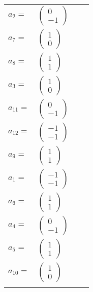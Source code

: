 \documentclass[1p]{elsarticle_modified}
\theoremstyle{definition}
\begin{document}
\begin{tabular}{m{7pt} m{180pt} m{7pt} m{180pt} }
\flushright $a_{2}=$&$\begin{pmatrix}0\\-1\end{pmatrix}$ \\
\flushright $a_{7}=$&$\begin{pmatrix}1\\0\end{pmatrix}$ \\
\flushright $a_{8}=$&$\begin{pmatrix}1\\1\end{pmatrix}$ \\
\flushright $a_{3}=$&$\begin{pmatrix}1\\0\end{pmatrix}$ \\
\flushright $a_{11}=$&$\begin{pmatrix}0\\-1\end{pmatrix}$ \\
\flushright $a_{12}=$&$\begin{pmatrix}-1\\-1\end{pmatrix}$ \\
\flushright $a_{9}=$&$\begin{pmatrix}1\\1\end{pmatrix}$ \\
\flushright $a_{1}=$&$\begin{pmatrix}-1\\-1\end{pmatrix}$ \\
\flushright $a_{6}=$&$\begin{pmatrix}1\\1\end{pmatrix}$ \\
\flushright $a_{4}=$&$\begin{pmatrix}0\\-1\end{pmatrix}$ \\
\flushright $a_{5}=$&$\begin{pmatrix}1\\1\end{pmatrix}$ \\
\flushright $a_{10}=$&$\begin{pmatrix}1\\0\end{pmatrix}$\\&\end{tabular}
\end{document}
